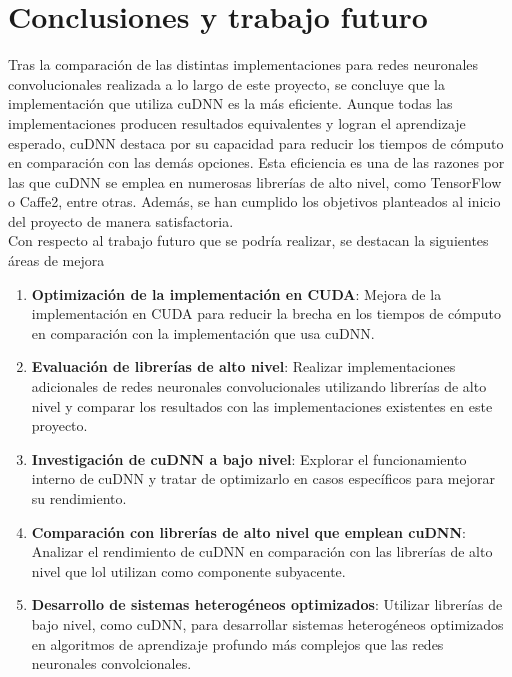 \chapter{Conclusiones y trabajo futuro}

Tras la comparación de las distintas implementaciones para redes neuronales convolucionales realizada a lo largo de este proyecto, se concluye que la implementación que utiliza cuDNN es la más eficiente. Aunque todas las implementaciones producen resultados equivalentes y logran el aprendizaje esperado, cuDNN destaca por su capacidad para reducir los tiempos de cómputo en comparación con las demás opciones. Esta eficiencia es una de las razones por las que cuDNN se emplea en numerosas librerías de alto nivel, como TensorFlow o Caffe2, entre otras. Además, se han cumplido los objetivos planteados al inicio del proyecto de manera satisfactoria. \\
Con respecto al trabajo futuro que se podría realizar, se destacan la siguientes áreas de mejora
\begin{enumerate}[label=\textbullet]
	\item \textbf{Optimización de la implementación en CUDA}: Mejora de la implementación en CUDA para reducir la brecha en los tiempos de cómputo en comparación con la implementación que usa cuDNN.
	\item \textbf{Evaluación de librerías de alto nivel}: Realizar implementaciones adicionales de redes neuronales convolucionales utilizando librerías de alto nivel y comparar los resultados con las implementaciones existentes en este proyecto.
	\item \textbf{Investigación de cuDNN a bajo nivel}: Explorar el funcionamiento interno de cuDNN y tratar de optimizarlo en casos específicos para mejorar su rendimiento.
	\item \textbf{Comparación con librerías de alto nivel que emplean cuDNN}: Analizar el rendimiento de cuDNN en comparación con las librerías de alto nivel que lol utilizan como componente subyacente.
	\item \textbf{Desarrollo de sistemas heterogéneos optimizados}: Utilizar librerías de bajo nivel, como cuDNN, para desarrollar sistemas heterogéneos optimizados en algoritmos de aprendizaje profundo más complejos que las redes neuronales convolcionales.  
\end{enumerate}